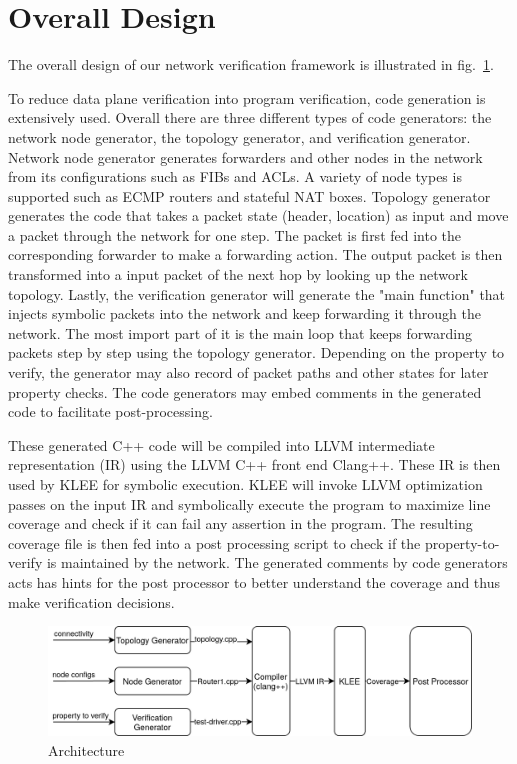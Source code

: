 \documentclass[letterpaper, 10 pt, conference]{ieeeconf}  %
\begin{document}
\section{Overall Design}\label{sec:overall}
The overall design of our network verification framework is illustrated in fig.~\ref{fig:arch}. 

To reduce data plane verification into program verification, code generation is extensively used. Overall there are three different types of code generators: the network node generator, the topology generator, and verification generator. Network node generator generates forwarders and other nodes in the network from its configurations such as FIBs and ACLs. A variety of node types is supported such as ECMP routers and stateful NAT boxes. Topology generator generates the code that takes a packet state (header, location) as input and move a packet through the network for one step. The packet is first fed into the corresponding forwarder to make a forwarding action. The output packet is then transformed into a input packet of the next hop by looking up the network topology. Lastly, the verification generator will generate the "main function" that injects symbolic packets into the network and keep forwarding it through the network. The most import part of it is the main loop that keeps forwarding packets step by step using the topology generator. Depending on the property to verify, the generator may also record of packet paths and other states for later property checks. The code generators may embed comments in the generated code to facilitate post-processing.

These generated C++ code will be compiled into LLVM intermediate representation (IR) using the LLVM C++ front end Clang++. These IR is then used by KLEE for symbolic execution. KLEE will invoke LLVM optimization passes on the input IR and symbolically execute the program to maximize line coverage and check if it can fail any assertion in the program. The resulting coverage file is then fed into a post processing script to check if the property-to-verify is maintained by the network. The generated comments by code generators acts has hints for the post processor to better understand the coverage and thus make verification decisions.
\begin{figure}[]
	\centering
	\includegraphics[width=\linewidth]{overview.png}
	\caption{Architecture}
	\label{fig:arch}
\end{figure}
\end{document}

